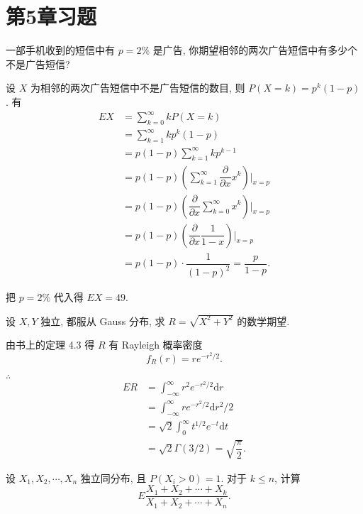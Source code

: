 \documentclass[color=black,device=normal,lang=cn]{elegantnote}
\numberwithin{equation}{section}
\theoremstyle{plain}
\newcounter{exsection}[section]
\numberwithin{exercise}{exsection}
\begin{document}
\section{第5章习题}
\addtocounter{exsection}{5}
\addtocounter{exercise}{4}
\begin{exercise}%
    一部手机收到的短信中有 $p=2\%$ 是广告, 你期望相邻的两次广告短信中有多少个不是广告短信?
\end{exercise}
\begin{solution}
    设 $X$ 为相邻的两次广告短信中不是广告短信的数目, 则 $P(X=k)=p^k(1-p)$. 有
    \begin{align*}
        EX & =\sum\limits_{k=0}^\infty kP(X=k) \\
        & =\sum\limits_{k=1}^\infty kp^k(1-p) \\
        & =p(1-p)\sum\limits_{k=1}^\infty kp^{k-1} \\
        & =p(1-p)\left(\sum\limits_{k=1}^\infty\dfrac{\partial}{\partial x}x^k\right)\Bigg|_{x=p} \\
        & =p(1-p)\left(\dfrac{\partial}{\partial x}\sum\limits_{k=0}^\infty x^k\right)\Bigg|_{x=p} \\
        & =p(1-p)\left(\dfrac{\partial}{\partial x}\dfrac{1}{1-x}\right)\Bigg|_{x=p} \\
        & =p(1-p)\cdot\dfrac{1}{(1-p)^2}=\dfrac{p}{1-p}.
    \end{align*}

    把 $p=2\%$ 代入得 $EX=49$.
\end{solution}
\addtocounter{exercise}{2}
\begin{exercise}%
    设 $X,Y$ 独立, 都服从 Gauss 分布, 求 $R=\sqrt{X^2+Y^2}$ 的数学期望.
\end{exercise}
\begin{solution}
    由书上的定理 4.3 得 $R$ 有 Rayleigh 概率密度
    \[f_R(r)=re^{-r^2/2}.\]

    $\therefore$
    \begin{align*}
        ER & =\int_{-\infty}^\infty r^2e^{-r^2/2}\mathrm{d}r \\
        & =\int_{-\infty}^\infty re^{-r^2/2}\mathrm{d}r^2/2 \\
        & =\sqrt{2}\int_0^\infty t^{1/2}e^{-t}\mathrm{d}t \\
        & =\sqrt{2}\Gamma(3/2)=\sqrt{\dfrac{\pi}{2}}.
    \end{align*}
\end{solution}
\newpage
\begin{exercise}%
    设 $X_1,X_2,\cdots,X_n$ 独立同分布, 且 $P(X_i>0)=1$. 对于 $k\leq n$, 计算
    \[E\dfrac{X_1+X_2+\cdots+X_k}{X_1+X_2+\cdots+X_n}.\]
\end{exercise}
\end{document}
